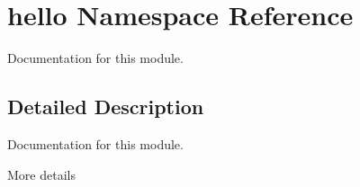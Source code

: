 \hypertarget{namespacehello}{}\section{hello Namespace Reference}
\label{namespacehello}


Documentation for this module.  




\subsection{Detailed Description}
Documentation for this module. 

More details 